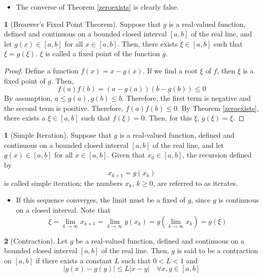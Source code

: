 \documentclass[12pt]{article}
\theoremstyle{definition}
\newtheorem{definition}{\color{NavyBlue}{\textbf{Definition}}}
\newtheorem{theorem}{\color{ForestGreen}{\textbf{Theorem}}}
\theoremstyle{definition}
\begin{document}
\begin{itemize}
\item The converse of Theorem \ref{zeroexists} is clearly false.
\end{itemize}

\begin{theorem}[Brouwer's Fixed Point Theorem]
Suppose that $g$ is a real-valued function, defined and continuous on a bounded closed interval $[a,b]$ of the real line, and let $g(x) \in [a,b]$ for all $x \in [a,b]$. Then, there exists $\xi \in [a,b]$ such that $\xi = g(\xi)$. $\xi$ is called a fixed point of the function $g$. 
\end{theorem}
\begin{proof}
Define a function $f(x) = x - g(x)$. If we find a root $\xi$ of $f$, then $\xi$ is a fixed point of $g$. Then,
\begin{equation}
f(a)f(b) = (a - g(a))(b-g(b)) \leq 0
\end{equation}
By assumption, $a \leq g(a), g(b) \leq b$. Therefore, the first term is negative and the second term is positive. Therefore, $f(a)f(b) \leq 0$. By Theorem \ref{zeroexists}, there exists a $\xi \in [a,b]$ such that $f(\xi)=0$. Then, for this $\xi$, $g(\xi) = \xi$.
\end{proof}

\begin{definition}[Simple Iteration]
Suppose that $g$ is a real-valued function, defined and continuous on a bounded closed interval $[a,b]$ of the real line, and let $g(x) \in [a,b]$ for all $x \in [a,b]$. Given that $x_0 \in [a,b]$, the recursion defined by 
\begin{equation}
x_{k+1} = g(x_k)
\end{equation}
is called simple iteration; the numbers $x_k$, $k \geq 0$, are referred to as iterates.
\end{definition}

\begin{itemize}
\item If this sequence converges, the limit must be a fixed of $g$, since $g$ is continuous on a closed interval. Note that
\begin{equation}
\xi = \lim_{k \to \infty} x_{k+1} = \lim_{k \to \infty} g(x_k) = g\left( \lim_{k \to \infty} x_k \right) = g(\xi)
\end{equation}
\end{itemize}

\begin{definition}[Contraction]
Let $g$ be a real-valued function, defined and continuous on a bounded closed interval $[a,b]$ of the real line. Then, $g$ is said to be a contraction on $[a,b]$ if there exists a constant $L$ such that $0<L<1$ and 
\begin{equation}
|g(x)-g(y)| \leq L|x-y| \quad \forall x,y \in [a,b]
\end{equation}
\end{definition}
\end{document}
